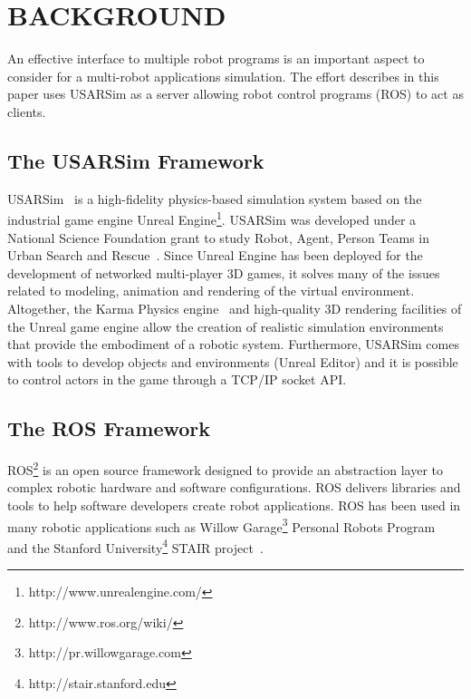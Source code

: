 \section*{BACKGROUND}\label{s:background}
An effective interface to multiple robot programs is an important aspect to consider for a multi-robot applications simulation. The effort describes in this paper uses USARSim as a server allowing robot control programs (ROS)
to act as clients.

\subsection*{The USARSim Framework}
USARSim~\cite{CARPIN.LNAI.2006,WANG.WSC.2003} is a high-fidelity physics-based simulation system based on the industrial game engine Unreal Engine\footnote{http://www.unrealengine.com/}. USARSim was developed under a National Science Foundation grant to study Robot, Agent, Person Teams in Urban Search and Rescue~\cite{LEWIS.ICHC.2003}. Since Unreal
Engine has been deployed for the development of networked multi-player 3D
games, it solves many of the issues related to modeling, animation and rendering
of the virtual environment. Altogether, the Karma Physics
engine~\cite{KarmEngine} and high-quality 3D rendering facilities of the Unreal game engine allow the creation of realistic simulation environments that provide the embodiment of a robotic system. Furthermore, USARSim comes with tools to develop objects and environments (Unreal Editor) and it is possible to control actors in the game through a TCP/IP socket API.


\subsection*{The ROS Framework}

ROS\footnote{http://www.ros.org/wiki/} is an open source framework designed to provide an abstraction layer to complex robotic hardware and software configurations. ROS delivers libraries and tools to help software developers create robot applications. ROS has been used in many robotic applications such as
Willow Garage\footnote{http://pr.willowgarage.com} Personal Robots Program~\cite{WYOBEK.ICRA.2008} and the Stanford University\footnote{http://stair.stanford.edu}
STAIR project~\cite{QUIGLEY.AAAI.2007}.


